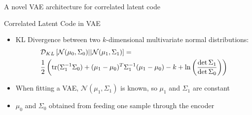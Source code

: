 \documentclass{beamer}
\def \tr{\ensuremath \text{tr}}
\theoremstyle{definition}
\begin{document}
\begin{frame}{A novel VAE architecture for correlated latent code}
  
\end{frame}

\begin{frame}{Correlated Latent Code in VAE}
\begin{itemize}
  \item KL Divergence between two $k$-dimensional multivariate normal distributions:
\begin{align*}
&\mathcal{D}_{KL}\left[\mathcal{N}(\mu_0, \Sigma_0) || \mathcal{N}(\mu_1, \Sigma_1)\right] = \\
&\frac{1}{2} \left(\tr(\Sigma_1^{-1} \Sigma_0) + (\mu_1 - \mu_0)^T \Sigma_1^{-1} (\mu_1 - \mu_0) - k + \ln\left(\frac{\det \Sigma_1}{\det \Sigma_0} \right) \right)
\end{align*}
  \item<2-> When fitting a VAE, $\mathcal{N}(\mu_1, \Sigma_1)$ is known, so $\mu_1$ and $\Sigma_1$ are constant
  \item<2-> $\mu_0$ and $\Sigma_0$ obtained from feeding one sample through the encoder
\end{itemize}
\end{frame}

\end{document}
